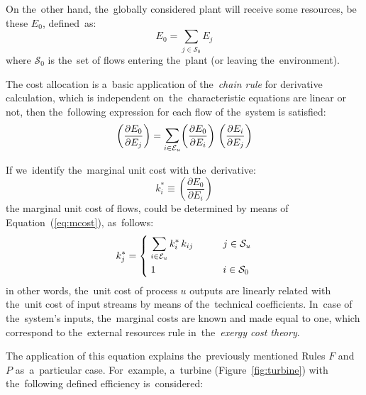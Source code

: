 \documentclass[energies,article,accept,moreauthors,pdftex]{Definitions/mdpi}
\newcommand{\dpartial}[2]{\left(\dfrac{\partial E_{#1}}{\partial E_{#2}}\right)}
\newcommand{\bsum}{\mathlarger{\sum}}
\begin{document}
On the~other hand, the~globally considered plant will receive some resources, be these $E_0$, defined~as:
\begin{equation}
E_0=\sum_{j\in\mathcal{S}_0}{E_j}
\end{equation}
where $\mathcal{S}_0$ is the~set of flows entering the~plant (or leaving the~environment).

The cost allocation is a~basic application of the~\emph{chain rule} for derivative calculation, which is independent on~the~characteristic equations are linear or not, then the~following expression for each flow of the~system is satisfied:
\begin{equation}
\dpartial{0}{j}=\bsum_{i\in\mathcal{E}_u}{\dpartial{0}{i}\,\dpartial{i}{j}}
\label{eq:mcost}
\end{equation}

If we~identify the~marginal unit cost with the~derivative:
\begin{equation}
k_i^*\equiv\dpartial{0}{i}
\end{equation}
the marginal unit cost of flows, could be determined by means of Equation~(\ref{eq:mcost}), as~follows:
\begin{equation}
    k_j^*=\begin{dcases}
    \;\sum\limits_{i\in\mathcal{E}_u}{k_i^*\,k_{ij}} \qquad &j\in\mathcal{S}_u \\
    \;1 \qquad &i\in\mathcal{S}_0
    \end{dcases}
    \label{eq:kchar}
\end{equation}
in other words, the~unit cost of process $u$ outputs are linearly related with the~unit cost of input streams by means of the~technical coefficients. In~case of the~system's inputs, the~marginal costs are known and made equal to one, which correspond to the~external resources rule in~the~\emph{exergy cost theory}.

The application of this equation explains the~previously mentioned Rules $F$ and $P$ as~a~particular case. For~example, a~turbine (Figure~\ref{fig:turbine}) with the~following defined efficiency is~considered:
\end{document}
